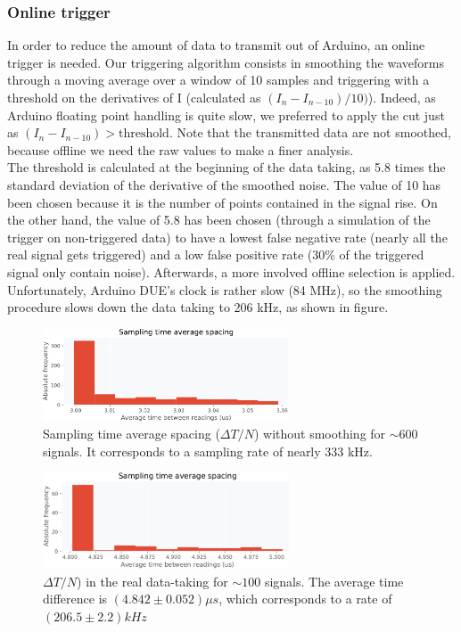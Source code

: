 \documentclass[12pt]{article}
\begin{document}
\subsubsection{Online trigger}
In order to reduce the amount of data to transmit out of Arduino, an online trigger is needed. Our triggering algorithm consists in smoothing the waveforms through a moving average over a window of 10 samples and triggering with a threshold on the derivatives of I (calculated as $(I_n - I_{n-10})/10)$). Indeed, as Arduino floating point handling is quite slow, we preferred to apply the cut just as $(I_n - I_{n-10}) > \text{threshold}$. Note that the transmitted data are not smoothed, because offline we need the raw values to make a finer analysis.\\
The threshold is calculated at the beginning of the data taking, as 5.8 times the standard deviation of the derivative of the smoothed noise.
The value of 10 has been chosen because it is the number of points contained in the signal rise. On the other hand, the value of 5.8 has been chosen (through a simulation of the trigger on non-triggered data) to have a lowest false negative rate (nearly all the real signal gets triggered) and a low false positive rate (30\% of the triggered signal only contain noise). Afterwards, a more involved offline selection is applied.\\
Unfortunately, Arduino DUE's clock is rather slow (84 MHz), so the smoothing procedure slows down the data taking to 206 kHz, as shown in figure.
\begin{figure}[H]
\centering
    \includegraphics[width=0.65\textwidth]{samplingrate_orig.pdf}
    \caption{Sampling time average spacing ($\Delta T / N$) without smoothing for $\sim 600$ signals. It corresponds to a sampling rate of nearly 333 kHz.}
\end{figure}
\vspace{-0.4cm}
\begin{figure}[H]
\centering
    \includegraphics[width=0.65\textwidth]{samplingrate.pdf}
    \caption{$\Delta T / N$) in the real data-taking for $\sim 100$ signals. The average time difference is $(4.842 \pm 0.052) \mu s$, which corresponds to a rate of $(206.5 \pm 2.2) kHz$}
\end{figure}
\end{document}
